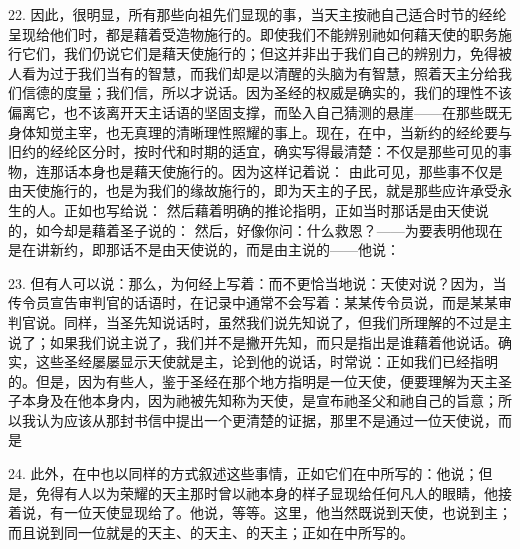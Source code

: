 22. 因此，很明显，所有那些向祖先们显现的事，当天主按祂自己适合时节的经纶呈现给他们时，都是藉着受造物施行的。即使我们不能辨别祂如何藉天使的职务施行它们，我们仍说它们是藉天使施行的；但这并非出于我们自己的辨别力，免得被人看为过于我们当有的智慧，而我们却是以清醒的头脑为有智慧，照着天主分给我们信德的度量；我们信，所以才说话。因为圣经的权威是确实的，我们的理性不该偏离它，也不该离开天主话语的坚固支撑，而坠入自己猜测的悬崖——在那些既无身体知觉主宰，也无真理的清晰理性照耀的事上。现在，在中，当新约的经纶要与旧约的经纶区分时，按时代和时期的适宜，确实写得最清楚：不仅是那些可见的事物，连那话本身也是藉天使施行的。因为这样记着说： 由此可见，那些事不仅是由天使施行的，也是为我们的缘故施行的，即为天主的子民，就是那些应许承受永生的人。正如也写给说： 然后藉着明确的推论指明，正如当时那话是由天使说的，如今却是藉着圣子说的： 然后，好像你问：什么救恩？——为要表明他现在是在讲新约，即那话不是由天使说的，而是由主说的——他说：\par

23. 但有人可以说：那么，为何经上写着：而不更恰当地说：天使对说？因为，当传令员宣告审判官的话语时，在记录中通常不会写着：某某传令员说，而是某某审判官说。同样，当圣先知说话时，虽然我们说先知说了，但我们所理解的不过是主说了；如果我们说主说了，我们并不是撇开先知，而只是指出是谁藉着他说话。确实，这些圣经屡屡显示天使就是主，论到他的说话，时常说：正如我们已经指明的。但是，因为有些人，鉴于圣经在那个地方指明是一位天使，便要理解为天主圣子本身及在他本身内，因为祂被先知称为天使，是宣布祂圣父和祂自己的旨意；所以我认为应该从那封书信中提出一个更清楚的证据，那里不是通过一位天使说，而是\par

24. 此外，在中也以同样的方式叙述这些事情，正如它们在中所写的：他说；但是，免得有人以为荣耀的天主那时曾以祂本身的样子显现给任何凡人的眼睛，他接着说，有一位天使显现给了。他说，等等。这里，他当然既说到天使，也说到主；而且说到同一位就是的天主、的天主、的天主；正如在中所写的。\par

